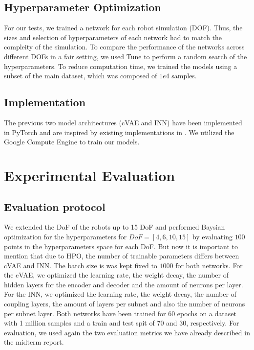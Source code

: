 \documentclass[conference]{IEEEtran}
\begin{document}
\subsection*{Hyperparameter Optimization}

For our tests, we trained a network for each robot simulation (DOF). Thus, the sizes and selection of hyperparameters of each network had to match the compleity of the simulation. To compare the performance of the networks across different DOFs in a fair setting, we used Tune \cite{liaw2018tune} to perform a random search of the hyperparameters. To reduce computation time, we trained the models using a subset of the main dataset, which was composed of \( 1e4 \) samples.


\subsection*{Implementation}

The previous two model architectures (cVAE and INN) have been implemented in PyTorch and are inspired by existing implementations in  \cite{graviraja2019, freia2020}. We utilized the Google Compute Engine to train our models.

\section*{Experimental Evaluation}

\subsection*{Evaluation protocol}

We extended the DoF of the robots up to 15 DoF and performed Baysian optimization for the hyperparameters for $DoF = [4, 6, 10, 15]$ by evaluating $100$ points in the hyperparameters space for each DoF. But now it is important to mention that due to HPO, the number of trainable parameters differs between cVAE and INN. The batch size is was kept fixed to $1000$ for both networks.
For the cVAE, we optimized the learning rate, the weight decay, the number of hidden layers for the encoder and decoder and the amount of neurons per layer. For the INN, we optimized the learning rate, the weight decay, the number of coupling layers, the amount of layers per subnet and also the number of neurons per subnet layer.
Both networks have been trained for 60 epochs on a dataset with 1 million samples and a train and test spit of 70 and 30, respectively. For evaluation, we used again the two evaluation metrics  we have already described in the midterm report.
\end{document}

